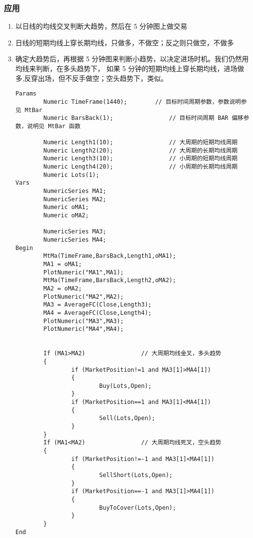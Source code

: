\documentclass[11pt]{ctexart}
\begin{document}
\subsubsection{应用}
\label{sec:org166d74b}
\begin{enumerate}
\item 以日线的均线交叉判断大趋势，然后在 5 分钟图上做交易
\item 日线的短期均线上穿长期均线，只做多，不做空；反之则只做空，不做多
\item 确定大趋势后，再根据 5 分钟图来判断小趋势，以决定进场时机。我们仍然用均线来判断，在多头趋势下，
如果 5 分钟的短期均线上穿长期均线，进场做多,反穿出场，但不反手做空；空头趋势下，类似。

\begin{verbatim}
Params
        Numeric TimeFrame(1440);        // 目标时间周期参数，参数说明参见 MtBar
        Numeric BarsBack(1);                // 目标时间周期 BAR 偏移参数，说明见 MtBar 函数

        Numeric Length1(10);                // 大周期的短期均线周期                
        Numeric Length2(20);                // 大周期的长期均线周期
        Numeric Length3(10);                // 小周期的短期均线周期
        Numeric Length4(20);                // 小周期的长期均线周期
        Numeric Lots(1);
Vars
        NumericSeries MA1;
        NumericSeries MA2;
        Numeric oMA1;
        Numeric oMA2;

        NumericSeries MA3;
        NumericSeries MA4;
Begin
        MtMa(TimeFrame,BarsBack,Length1,oMA1);
        MA1 = oMA1;
        PlotNumeric("MA1",MA1);
        MtMa(TimeFrame,BarsBack,Length2,oMA2);
        MA2 = oMA2;
        PlotNumeric("MA2",MA2);
        MA3 = AverageFC(Close,Length3);
        MA4 = AverageFC(Close,Length4);
        PlotNumeric("MA3",MA3);
        PlotNumeric("MA4",MA4);


        If (MA1>MA2)                // 大周期均线金叉，多头趋势
        {
                if (MarketPosition!=1 and MA3[1]>MA4[1])
                {
                        Buy(Lots,Open);
                }
                if (MarketPosition==1 and MA3[1]<MA4[1])
                {
                        Sell(Lots,Open);
                }
        }
        If (MA1<MA2)                // 大周期均线死叉，空头趋势
        {
                if (MarketPosition!=-1 and MA3[1]<MA4[1])
                {
                        SellShort(Lots,Open);
                }
                if (MarketPosition==-1 and MA3[1]>MA4[1])
                {
                        BuyToCover(Lots,Open);
                }
        }
End
\end{verbatim}
\end{enumerate}
\end{document}
